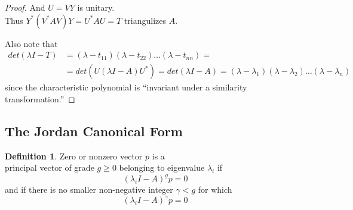 \documentclass[twoside]{amsart}
\theoremstyle{plain}
\theoremstyle{definition}
\newtheorem{definition}{Definition}
\begin{document}
\begin{proof}
And $U=VY$ is unitary.  \\
Thus $Y^* (V^* A V)Y = U^* AU = T$ triangulizes $A$.  

Also note that
\begin{align*}
det(\lambda I -T) & = (\lambda - t_{11})(\lambda - t_{22}) \dots (\lambda - t_{nn} ) = \\
& = det( U (\lambda I - A) U^* ) = det( \lambda I -A) = (\lambda - \lambda_1)(\lambda - \lambda_2) \dots (\lambda - \lambda_n )
\end{align*}
since the characteristic polynomial is ``invariant under a similarity transformation.''
\end{proof}

\subsection{ The Jordan Canonical Form }\label{subS:Jordan_Canonical_Form}
\begin{definition}
  Zero or nonzero vector $p$ is a \\
  principal vector of grade $g \geq 0$ belonging to eigenvalue $\lambda_i$ if 
  \begin{equation*}
    (\lambda_i I - A)^g p = 0 
  \end{equation*}
  and if there is no smaller non-negative integer $\gamma < g$ for which 
  \begin{equation*}
    (\lambda_i I- A)^{\gamma} p = 0 
  \end{equation*}
\end{definition}
\end{document}
